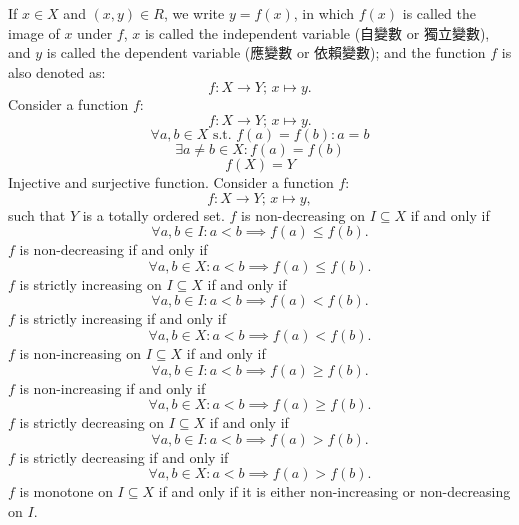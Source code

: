 \documentclass[a4paper,12pt]{report}
\begin{document}
If $x\in X$ and $(x, y) \in R$, we write $y = f(x)$, in which $f(x)$ is called the image of $x$ under $f$, $x$ is called the independent variable (自變數 or 獨立變數), and $y$ is called the dependent variable (應變數 or 依賴變數); and the function $f$ is also denoted as:
\[f \colon X \to Y;\, x \mapsto y.\]
Consider a function $f$:
\[f\colon X\to Y;\,x\mapsto y.\]
\[\forall a,b\in X\text{\ s.t.\ } f(a)=f(b)\colon a=b\]
\[\exists a\neq b\in X\colon f(a)=f(b)\]
\[f(X)=Y\]
Injective and surjective function.
Consider a function $f$:
\[f\colon X\to Y;\,x\mapsto y,\]
such that $Y$ is a totally ordered set.
$f$ is non-decreasing on $I\subseteq X$ if and only if
\[\forall a,b\in I\colon a<b\implies f(a)\leq f(b).\]
$f$ is non-decreasing if and only if
\[\forall a,b\in X\colon a<b\implies f(a)\leq f(b).\]
$f$ is strictly increasing on $I\subseteq X$ if and only if
\[\forall a,b\in I\colon a<b\implies f(a)<f(b).\]
$f$ is strictly increasing if and only if
\[\forall a,b\in X\colon a<b\implies f(a)<f(b).\]
$f$ is non-increasing on $I\subseteq X$ if and only if
\[\forall a,b\in I\colon a<b\implies f(a)\geq f(b).\]
$f$ is non-increasing if and only if
\[\forall a,b\in X\colon a<b\implies f(a)\geq f(b).\]
$f$ is strictly decreasing on $I\subseteq X$ if and only if
\[\forall a,b\in I\colon a<b\implies f(a)>f(b).\]
$f$ is strictly decreasing if and only if
\[\forall a,b\in X\colon a<b\implies f(a)>f(b).\]
$f$ is monotone on $I\subseteq X$ if and only if it is either non-increasing or non-decreasing on $I$.
\end{document}
